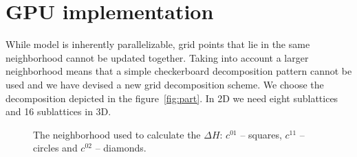 \documentclass[a4paper]{llncs}
\def\bksize{8}
\def\bkcount{4}
\def\lcsize{5}
\begin{document}
\section{GPU implementation}

While model is inherently parallelizable, grid points that lie in the
same neighborhood cannot be updated together. Taking into account a
larger neighborhood means that a simple checkerboard decomposition
pattern cannot be used and we have devised a new grid decomposition
scheme. We choose the decomposition depicted in the
figure~\ref{fig:part}. In 2D we need eight sublattices and 16
sublattices in 3D.
\begin{figure}
\begin{center}
\end{center}
\caption{\label{fig:nn}The neighborhood used to calculate the $\Delta H$:
$c^{01}$ -- squares, $c^{11}$ -- circles and $c^{02}$ -- diamonds.}
\end{figure}
\end{document}
